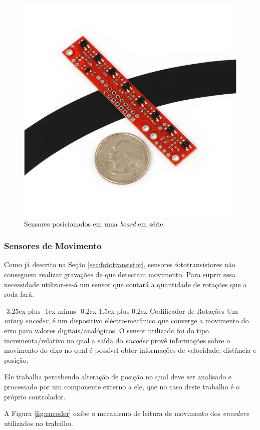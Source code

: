 \documentclass[portugues, brazil, a4paper,12pt]{article}
\makeatletter
\renewcommand{\paragraph}{\@startsection{paragraph}{4}{0ex}%
   {-3.25ex plus -1ex minus -0.2ex}%
   {1.5ex plus 0.2ex}%
   {\normalfont\normalsize\bfseries}}
\makeatother
\begin{document}
				\begin{figure}[h]
					\centering
					\includegraphics[width=0.7\linewidth]{img/elementos-sensores_series.jpg}
					\caption{Sensores posicionados em uma \textit{board} em série.}
					\label{fig:sensores_series}
				\end{figure}


		\subsubsection{Sensores de Movimento} \label{sec:movimentos}
			Como já descrito na Seção \ref{sec:fototransistor}, sensores fototransistores não conseguem realizar gravações de que detectam movimento. Para suprir essa necessidade utilizar-se-á um sensor que contará a quantidade de rotações que a roda fará.

			\paragraph{Codificador de Rotações} \label{sec:encoder}
				Um \textit{rotary encoder}, é um dispositivo eléctro-mecânico que converge a movimento do eixo para valores digitais/analógicos. O sensor utilizado foi do tipo incrementa/relativo no qual a saída do \textit{encoder} provê informações sobre o movimento do eixo no qual é possível obter informações de velocidade, distância e posição.

				Ele trabalha percebendo alteração de posição no qual deve ser analisado e processado por um componente externo a ele, que no caso deste trabalho é o próprio controlador.

				A Figura \ref{fig:encoder} exibe o mecanismo de leitura de movimento dos \textit{encoders} utilizados no trabalho.
\end{document}
